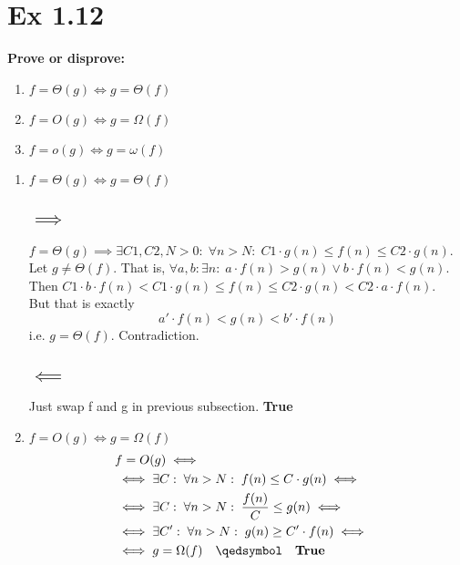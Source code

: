 \section*{Ex 1.12}
\begin{mdframed}
	\textbf{Prove or disprove:} 
	\begin{enumerate}
		\item $f = \Theta(g) \iff g = \Theta(f)$
		\item $f = O(g) \iff g = \Omega(f)$
		\item $f = o(g) \iff g = \omega(f)$
	\end{enumerate}
\end{mdframed}

\begin{enumerate}
	\item $f = \Theta(g) \iff g = \Theta(f)$
		\subsection*{$\implies$}
		$f =\Theta(g) \implies 
		\exists C1, C2, N > 0:\; \forall n > N:\; C1\cdot g(n) \le f(n) \le C2\cdot g(n)$. \\
		Let $g \ne \Theta(f)$. That is, $\forall a, b: \exists n:\; a\cdot f(n) > g(n) \vee b\cdot f(n) < g(n)$.\\
		Then $C1\cdot b\cdot f(n) < C1\cdot g(n) \le f(n) \le C2\cdot g(n) < C2\cdot a \cdot f(n)$. \\
		But that is exactly \[a' \cdot f(n) < g(n) < b'\cdot f(n)\] i.e. $g = \Theta(f)$. Contradiction.

		\subsection*{$\impliedby$}
		Just swap f and g in previous subsection.
		\quad \qedsymbol \quad \textbf{True}

	\item $f = O(g) \iff g = \Omega(f)$
	\begin{align*}
		& f = O(g) \iff& \\
		& \iff \exists C:\; \forall n>N:\; f(n) \le C\cdot g(n) \iff& \\
		& \iff\exists C:\; \forall n>N:\; \frac{f(n)}{C} \le g(n) \iff& \\
		& \iff\exists C':\; \forall n>N:\; g(n) \ge C'\cdot f(n) \iff& \\
		& \iff g = \Omega(f) \quad \qedsymbol \quad \textbf{True}& 
	\end{align*}
	



\end{enumerate}
